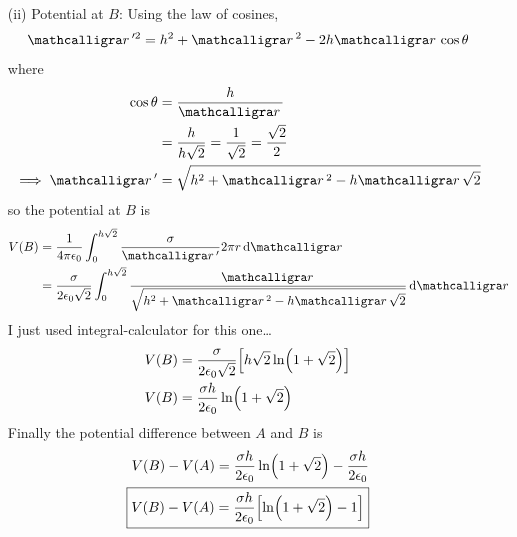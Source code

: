 \documentclass[../main.tex]{subfiles}
\begin{document}
\begin{itemize}
    \item[(ii)] Potential at $B$: Using the law of cosines,
    \begin{align*}
        \scriptr'^2 = h^2 + \scriptr^2 - 2h\scriptr\cos\theta
    \end{align*}
    where
    \begin{align*}
        \cos\theta &= \frac{h}{\scriptr} \\
        &= \frac{h}{h\sqrt{2}} = \frac{1}{\sqrt{2}} = \frac{\sqrt{2}}{2} \\
        \implies \scriptr' &= \sqrt{h^2 + \scriptr^2 - h\scriptr\sqrt{2}}
    \end{align*}
    so the potential at $B$ is
    \begin{align*}
        V(B) &= \ke \int_0^{h\sqrt{2}} \frac{\sigma}{\scriptr'} 2\pi r \dd{\scriptr} \\
        &= \frac{\sigma}{2\epsilon_0\sqrt{2}} \int_0^{h\sqrt{2}} \frac{\scriptr}{\sqrt{h^2 + \scriptr^2 - h\scriptr\sqrt{2}}} \dd{\scriptr}
    \end{align*}
    I just used integral-calculator for this one\dots
    \begin{align*}
        V(B) &= \frac{\sigma}{2\epsilon_0\sqrt{2}} \qt[h\sqrt{2} \ln(1 + \sqrt{2})] \\
        V(B) &= \frac{\sigma h}{2\epsilon_0} \ln(1 + \sqrt{2})
    \end{align*}
    Finally the potential difference between $A$ and $B$ is
    \begin{align*}
        V(B) - V(A) = \frac{\sigma h}{2\epsilon_0} \ln(1 + \sqrt{2}) - \frac{\sigma h}{2\epsilon_0} \\
        \boxed{V(B) - V(A) = \frac{\sigma h}{2\epsilon_0} \qt[\ln(1 + \sqrt{2}) - 1]}
    \end{align*}
\end{itemize}

\newpage 
\end{document}
